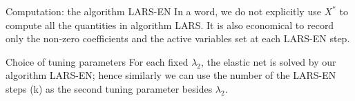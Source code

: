 \begin{frame}{Computation: the algorithm LARS-EN}
    In a word, we do not explicitly use $X^*$ to compute all the quantities in algorithm LARS. It is also economical to record only the non-zero coefficients and the active variables set at each LARS-EN step.
\end{frame}

\begin{frame}{Choice of tuning parameters}
    For each fixed $\lambda_2$, the elastic net is solved by our algorithm LARS-EN; hence similarly we can use the number of the LARS-EN steps (k) as the second tuning parameter besides $\lambda_2$.
\end{frame}
